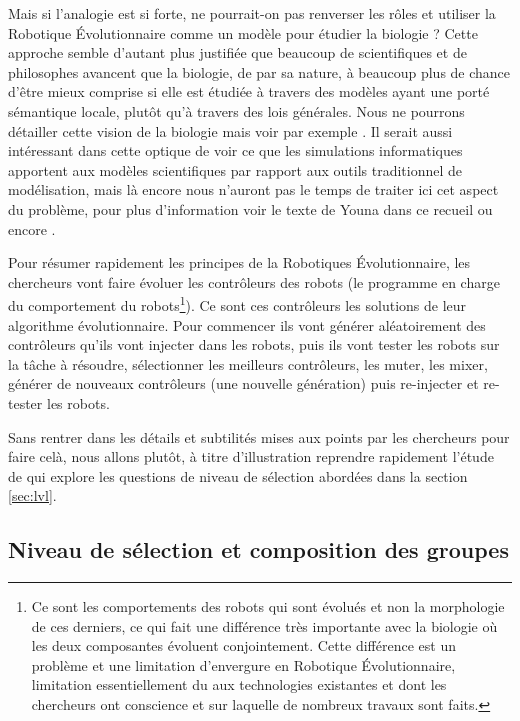 \documentclass[a4paper,10pt]{article}
\begin{document}
Mais si l'analogie est si forte, ne pourrait-on pas renverser les rôles et utiliser la Robotique \'Evolutionnaire comme un modèle pour étudier la biologie ? Cette approche semble d'autant plus justifiée que beaucoup de scientifiques et de philosophes avancent que la biologie, de par sa nature, à beaucoup plus de chance d'être mieux comprise si elle est étudiée à travers des modèles ayant une porté sémantique locale, plutôt qu'à travers des lois générales. Nous ne pourrons détailler cette vision de la biologie mais voir par exemple \cite{beatty1987onbehalfofsemanticview}. Il serait aussi intéressant dans cette optique de voir ce que les simulations informatiques apportent aux modèles scientifiques par rapport aux outils traditionnel de modélisation, mais là encore nous n'auront pas le temps de traiter ici cet aspect du problème, pour plus d'information voir le texte de Youna dans ce recueil ou encore \cite{winsberg03simulatedexperimentsmethodologyforavirtualworld}.

Pour résumer rapidement les principes de la Robotiques \'Evolutionnaire, les chercheurs vont faire évoluer les contrôleurs des robots (le programme en charge du comportement du robots\footnote{Ce sont les comportements des robots qui sont évolués et non la morphologie de ces derniers, ce qui fait une différence très importante avec la biologie où les deux composantes évoluent conjointement. Cette différence est un problème et une limitation d'envergure en Robotique \'Evolutionnaire, limitation essentiellement du aux technologies existantes et dont les chercheurs ont conscience et sur laquelle de nombreux travaux sont faits\citep{pollack2000thegolemproject}.}). Ce sont ces contrôleurs les solutions de leur algorithme évolutionnaire. Pour commencer ils vont générer aléatoirement des contrôleurs qu'ils vont injecter dans les robots, puis ils vont tester les robots sur la tâche à résoudre, sélectionner les meilleurs contrôleurs, les muter, les mixer, générer de nouveaux contrôleurs (une nouvelle génération) puis re-injecter et re-tester les robots. 

Sans rentrer dans les détails et subtilités mises aux points par les chercheurs pour faire celà, nous allons plutôt, à titre d'illustration reprendre rapidement l'étude de \cite{waibel09geneticteamcompositionlevelselectionevolutioncooperation} qui explore les questions de niveau de sélection abordées dans la section \ref{sec:lvl}.


\subsection{Niveau de sélection et composition des groupes \citep{waibel09geneticteamcompositionlevelselectionevolutioncooperation}}\label{sec:nscg}
\end{document}
